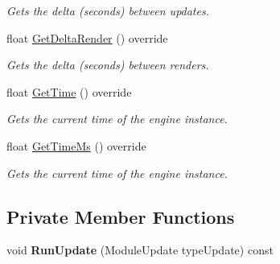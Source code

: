 \begin{DoxyCompactItemize}
\begin{DoxyCompactList}\small\item\em Gets the delta (seconds) between updates. \end{DoxyCompactList}\item 
float \hyperlink{class_flounder_1_1_glfw_updater_ad93f3d6d4fde740f66339f5b894e5869}{Get\+Delta\+Render} () override
\begin{DoxyCompactList}\small\item\em Gets the delta (seconds) between renders. \end{DoxyCompactList}\item 
float \hyperlink{class_flounder_1_1_glfw_updater_aa137ad553810d231b78ba0767dd4c743}{Get\+Time} () override
\begin{DoxyCompactList}\small\item\em Gets the current time of the engine instance. \end{DoxyCompactList}\item 
float \hyperlink{class_flounder_1_1_glfw_updater_aab04afa141bf3837a25159746919e2df}{Get\+Time\+Ms} () override
\begin{DoxyCompactList}\small\item\em Gets the current time of the engine instance. \end{DoxyCompactList}\end{DoxyCompactItemize}
\subsection*{Private Member Functions}
\begin{DoxyCompactItemize}
\item 
\mbox{\label{class_flounder_1_1_glfw_updater_afc927a326eeed16f9e075392f0a10f08}} 
void {\bfseries Run\+Update} (Module\+Update type\+Update) const
\end{DoxyCompactItemize}
